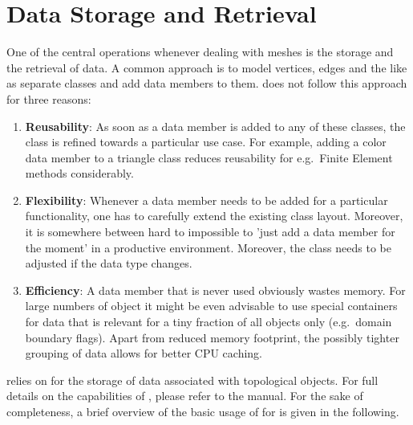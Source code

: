 \chapter{Data Storage and Retrieval} \label{chap:data}

 

One of the central operations whenever dealing with meshes is the storage and the retrieval of data.
A common approach is to model vertices, edges and the like as separate classes and add data members to them.
{\ViennaGrid} does not follow this approach for three reasons:
\begin{enumerate}
 \item \textbf{Reusability}: As soon as a data member is added to any of these classes, the class is refined towards a particular use case. For example, adding a color data member to a triangle class reduces reusability for e.g.~Finite Element methods considerably.
 \item \textbf{Flexibility}: Whenever a data member needs to be added for a particular functionality, one has to carefully extend the existing class layout. Moreover, it is somewhere between hard to impossible to 'just add a data member for the moment' in a productive environment. Moreover, the class needs to be adjusted if the data type changes.
 \item \textbf{Efficiency}: A data member that is never used obviously wastes memory. For large numbers of object it might be even advisable to use special containers for data that is relevant for a tiny fraction of all objects only (e.g.~domain boundary flags). Apart from reduced memory footprint, the possibly tighter grouping of data allows for better CPU caching. 
\end{enumerate}
{\ViennaGrid} relies on {\ViennaData} \cite{ViennaData} for the storage of data associated with topological objects.
For full details on the capabilities of {\ViennaData}, please refer to the {\ViennaData} manual.
For the sake of completeness, a brief overview of the basic usage of {\ViennaData} for {\ViennaGrid} is given in the following.


